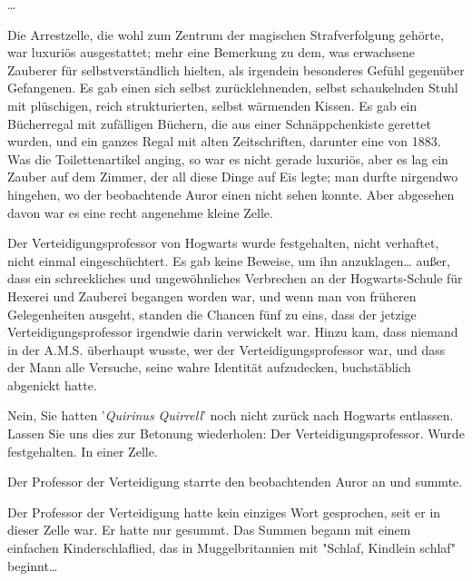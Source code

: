 {…

Die Arrestzelle, die wohl zum Zentrum der magischen Strafverfolgung gehörte, war luxuriös ausgestattet; mehr eine Bemerkung zu dem, was erwachsene Zauberer für selbstverständlich hielten, als irgendein besonderes Gefühl gegenüber Gefangenen. Es gab einen sich selbst zurücklehnenden, selbst schaukelnden Stuhl mit plüschigen, reich strukturierten, selbst wärmenden Kissen. Es gab ein Bücherregal mit zufälligen Büchern, die aus einer Schnäppchenkiste gerettet wurden, und ein ganzes Regal mit alten Zeitschriften, darunter eine von 1883. Was die Toilettenartikel anging, so war es nicht gerade luxuriös, aber es lag ein Zauber auf dem Zimmer, der all diese Dinge auf Eis legte; man durfte nirgendwo hingehen, wo der beobachtende Auror einen nicht sehen konnte. Aber abgesehen davon war es eine recht angenehme kleine Zelle.

Der Verteidigungsprofessor von Hogwarts wurde festgehalten, nicht verhaftet, nicht einmal eingeschüchtert. Es gab keine Beweise, um ihn anzuklagen… außer, dass ein schreckliches und ungewöhnliches Verbrechen an der Hogwarts-Schule für Hexerei und Zauberei begangen worden war, und wenn man von früheren Gelegenheiten ausgeht, standen die Chancen fünf zu eins, dass der jetzige Verteidigungsprofessor irgendwie darin verwickelt war. Hinzu kam, dass niemand in der A.M.S. überhaupt wusste, wer der Verteidigungsprofessor war, und dass der Mann alle Versuche, seine wahre Identität aufzudecken, buchstäblich abgenickt hatte.

Nein, Sie hatten '\emph{Quirinus Quirrell}' noch nicht zurück nach Hogwarts entlassen. Lassen Sie uns dies zur Betonung wiederholen: Der Verteidigungsprofessor. Wurde festgehalten. In einer Zelle.

Der Professor der Verteidigung starrte den beobachtenden Auror an und summte.

Der Professor der Verteidigung hatte kein einziges Wort gesprochen, seit er in dieser Zelle war. Er hatte nur gesummt. Das Summen begann mit einem einfachen Kinderschlaflied, das in Muggelbritannien mit "Schlaf, Kindlein schlaf" beginnt…

}
